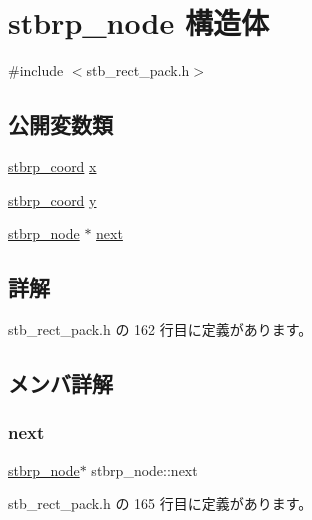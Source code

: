 \hypertarget{structstbrp__node}{}\section{stbrp\+\_\+node 構造体}
\label{structstbrp__node}


{\ttfamily \#include $<$stb\+\_\+rect\+\_\+pack.\+h$>$}

\subsection*{公開変数類}
\begin{DoxyCompactItemize}
\item 
\mbox{\hyperlink{stb__rect__pack_8h_ac2c2491b95dea6a298b7423dc762dfd9}{stbrp\+\_\+coord}} \mbox{\hyperlink{structstbrp__node_a45ab31a88025db27d08040d715b129ea}{x}}
\item 
\mbox{\hyperlink{stb__rect__pack_8h_ac2c2491b95dea6a298b7423dc762dfd9}{stbrp\+\_\+coord}} \mbox{\hyperlink{structstbrp__node_ad0415cb102a4f37aa45073653307e67e}{y}}
\item 
\mbox{\hyperlink{structstbrp__node}{stbrp\+\_\+node}} $\ast$ \mbox{\hyperlink{structstbrp__node_a933cb2dd6cddc4fcaf10e3b40634bed4}{next}}
\end{DoxyCompactItemize}


\subsection{詳解}


 stb\+\_\+rect\+\_\+pack.\+h の 162 行目に定義があります。



\subsection{メンバ詳解}
\mbox{\label{structstbrp__node_a933cb2dd6cddc4fcaf10e3b40634bed4}} 
\subsubsection{\texorpdfstring{next}{next}}
{\footnotesize\ttfamily \mbox{\hyperlink{structstbrp__node}{stbrp\+\_\+node}}$\ast$ stbrp\+\_\+node\+::next}



 stb\+\_\+rect\+\_\+pack.\+h の 165 行目に定義があります。

